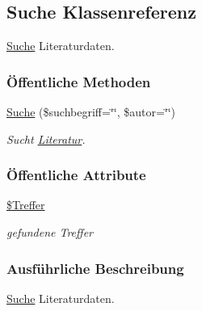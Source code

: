 \hypertarget{classSuche}{
\subsection{Suche Klassenreferenz}
\label{classSuche}
}
\hyperlink{classSuche}{Suche} Literaturdaten.  


\subsubsection*{\"{O}ffentliche Methoden}
\begin{CompactItemize}
\item 
\hyperlink{classSuche_277cd59d3689d6f0875d114be0024935}{Suche} (\$suchbegriff=\char`\"{}\char`\"{}, \$autor=\char`\"{}\char`\"{})
\begin{CompactList}\small\item\em Sucht \hyperlink{classLiteratur}{Literatur}. \item\end{CompactList}\end{CompactItemize}
\subsubsection*{\"{O}ffentliche Attribute}
\begin{CompactItemize}
\item 
\hyperlink{classSuche_0ee0e1ffb3f79392915fd39934d7140d}{\$Treffer}
\begin{CompactList}\small\item\em gefundene Treffer \item\end{CompactList}\end{CompactItemize}


\subsubsection{Ausf\"{u}hrliche Beschreibung}
\hyperlink{classSuche}{Suche} Literaturdaten. 


